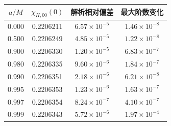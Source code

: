 \documentclass[UTF8,fontset=fandol,11pt,a4paper,oneside]{ctexart}
\numberwithin{equation}{section}
\begin{document}
\par\addvspace{14pt}
\noindent\begin{minipage}{\linewidth}
\captionsetup{type=table}\caption{轴对称单极零频外推及解析常数的跨自旋检验。}\label{audit:tab:l0-zero-frequency}
\centering\fontsize{10}{13.5}\selectfont
\setlength{\tabcolsep}{6pt}\renewcommand{\arraystretch}{1.2}
\begin{tabular}{cccc}\toprule
$a/M$ & $\chi_{H,00}(0)$ & 解析相对偏差 & 最大阶数变化\\\midrule
0.000 & 0.2206211 & $6.57\times10^{-5}$ & $1.46\times10^{-8}$\\
0.500 & 0.2206249 & $4.85\times10^{-5}$ & $1.22\times10^{-8}$\\
0.900 & 0.2206330 & $1.20\times10^{-5}$ & $6.83\times10^{-7}$\\
0.980 & 0.2206335 & $9.60\times10^{-6}$ & $1.84\times10^{-7}$\\
0.990 & 0.2206351 & $2.18\times10^{-6}$ & $6.21\times10^{-8}$\\
0.995 & 0.2206353 & $1.23\times10^{-6}$ & $1.63\times10^{-7}$\\
0.997 & 0.2206354 & $8.24\times10^{-7}$ & $4.10\times10^{-7}$\\
0.999 & 0.2206343 & $5.72\times10^{-6}$ & $1.97\times10^{-4}$\\
\bottomrule\end{tabular}
\end{minipage}\par\addvspace{10pt}
\par\addvspace{14pt}
\end{document}
